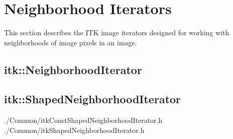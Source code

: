 \section{Neighborhood Iterators}
\label{sec:NeighborhoodIterators}
This section describes the ITK image iterators designed for working with
neighborhoods of image pixels in an image. 
% 




\subsection{itk::NeighborhoodIterator}
\label{sec:itkNeighborhoodIterator}

% 




\subsection{itk::ShapedNeighborhoodIterator}
\label{sec:itkShapedNeighborhoodIterator}
./Common/itkConstShapedNeighborhoodIterator.h
./Common/itkShapedNeighborhoodIterator.h


